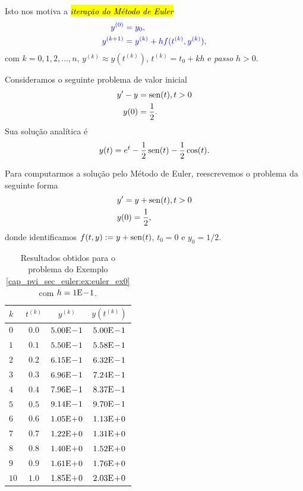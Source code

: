 Isto nos motiva a \hl{\emph{iteração do Método de Euler}}{\euler}
\begin{subequations}\hleq
  \begin{align}
    y^{(0)} &= y_0,\\
    y^{(k+1)} &= y^{(k)} + hf(t^{(k)},y^{(k)}),
  \end{align}
\end{subequations}
com $k=0, 1, 2, \dotsc, n$, $y^{(k)}\approx y\left(t^{(k)}\right)$, $t^{(k)} = t_0 + kh$ e \emph{passo} $h>0$.

\begin{ex}\label{cap_pvi_sec_euler:ex:euler_ex0}
  Consideramos o seguinte problema de valor inicial
  \begin{subequations}
    \begin{align}
      y' - y &= \operatorname{sen}(t), t>0\\
      y(0) &= \frac{1}{2}.
    \end{align}
  \end{subequations}
  Sua solução analítica é
  \begin{equation}
    y(t) = e^t - \frac{1}{2}\operatorname{sen}(t) - \frac{1}{2}\cos(t).
  \end{equation}

  Para computarmos a solução pelo Método de Euler, reescrevemos o problema da seguinte forma
  \begin{subequations}
    \begin{align}
      &y' = y + \operatorname{sen}(t), t>0\\
      &y(0) = \frac{1}{2},
    \end{align}
  \end{subequations}
  donde identificamos $f(t,y) := y + \operatorname{sen}(t)$, $t_0=0$ e $y_0=1/2$.

  \begin{table}[H]
    \centering
    \caption{Resultados obtidos para o problema do Exemplo \ref{cap_pvi_sec_euler:ex:euler_ex0} com $h=1\mathrm{E}\!-\!1$.}
    \begin{tabular}{l|cc|c}
      $k$ & $t^{(k)}$ &  $y^{(k)}$ & $y\left(t^{(k)}\right)$ \\\hline
      $0$ & $0.0$ & $5.00\mathrm{E}\!-\!1$ & $5.00\mathrm{E}\!-\!1$\\
      $1$ & $0.1$ & $5.50\mathrm{E}\!-\!1$ & $5.58\mathrm{E}\!-\!1$\\
      $2$ & $0.2$ & $6.15\mathrm{E}\!-\!1$ & $6.32\mathrm{E}\!-\!1$\\
      $3$ & $0.3$ & $6.96\mathrm{E}\!-\!1$ & $7.24\mathrm{E}\!-\!1$\\
      $4$ & $0.4$ & $7.96\mathrm{E}\!-\!1$ & $8.37\mathrm{E}\!-\!1$\\
      $5$ & $0.5$ & $9.14\mathrm{E}\!-\!1$ & $9.70\mathrm{E}\!-\!1$\\
      $6$ & $0.6$ & $1.05\mathrm{E}\!+\!0$ & $1.13\mathrm{E}\!+\!0$\\
      $7$ & $0.7$ & $1.22\mathrm{E}\!+\!0$ & $1.31\mathrm{E}\!+\!0$\\
      $8$ & $0.8$ & $1.40\mathrm{E}\!+\!0$ & $1.52\mathrm{E}\!+\!0$\\
      $9$ & $0.9$ & $1.61\mathrm{E}\!+\!0$ & $1.76\mathrm{E}\!+\!0$\\
      $10$ & $1.0$ & $1.85\mathrm{E}\!+\!0$ & $2.03\mathrm{E}\!+\!0$\\\hline
    \end{tabular}
  \end{table}


\end{ex}
